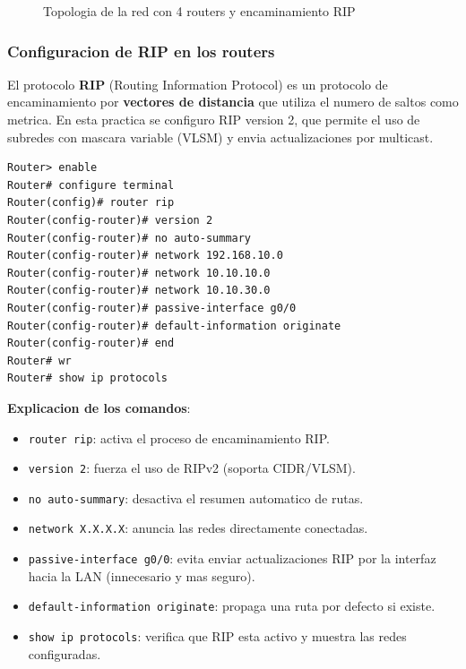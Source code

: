 \begin{figure}[H]
\centering
{}
\caption{Topologia de la red con 4 routers y encaminamiento RIP}
\label{fig:topologia-rip}
\end{figure}

\subsubsection{Configuracion de RIP en los routers}

El protocolo \textbf{RIP} (Routing Information Protocol) es un protocolo de
encaminamiento por \textbf{vectores de distancia} que utiliza el numero de saltos
como metrica. En esta practica se configuro RIP version 2, que permite el uso de
subredes con mascara variable (VLSM) y envia actualizaciones por multicast.

\begin{lstlisting}[caption={Configuracion de RIP en Router 0},label={lst:router0-rip}]
Router> enable
Router# configure terminal
Router(config)# router rip
Router(config-router)# version 2
Router(config-router)# no auto-summary
Router(config-router)# network 192.168.10.0
Router(config-router)# network 10.10.10.0
Router(config-router)# network 10.10.30.0
Router(config-router)# passive-interface g0/0
Router(config-router)# default-information originate
Router(config-router)# end
Router# wr
Router# show ip protocols
\end{lstlisting}

\textbf{Explicacion de los comandos}:
\begin{itemize}
    \item \texttt{router rip}: activa el proceso de encaminamiento RIP.
    \item \texttt{version 2}: fuerza el uso de RIPv2 (soporta CIDR/VLSM).
    \item \texttt{no auto-summary}: desactiva el resumen automatico de rutas.
    \item \texttt{network X.X.X.X}: anuncia las redes directamente conectadas.
    \item \texttt{passive-interface g0/0}: evita enviar actualizaciones RIP por
    la interfaz hacia la LAN (innecesario y mas seguro).
    \item \texttt{default-information originate}: propaga una ruta por defecto si
    existe.
    \item \texttt{show ip protocols}: verifica que RIP esta activo y muestra las redes
    configuradas.
\end{itemize}

